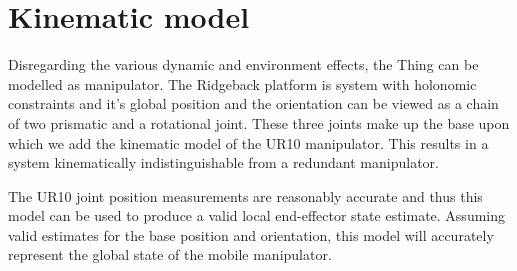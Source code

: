 \documentclass[times, utf8, diplomski, english]{fer}
\begin{document}
\section{Kinematic model}\label{section:Kinematics}
Disregarding the various dynamic and environment effects, the Thing can be modelled as manipulator.
The Ridgeback platform is system with holonomic constraints and it's global position and the orientation can be viewed as a chain of two prismatic and a rotational joint. 
These three joints make up the base upon which we add the kinematic model of the UR10 manipulator.
This results in a system kinematically indistinguishable from a redundant manipulator.

The UR10 joint position measurements are reasonably accurate and thus this model can be used to produce a valid local end-effector state estimate.
Assuming valid estimates for the base position and orientation, this model will accurately represent the global state of the mobile manipulator.
\end{document}
